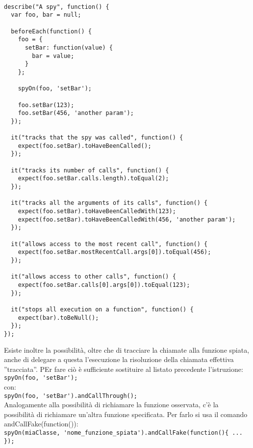 \documentclass[10pt,a4paper,onecolumn]{article}
\begin{document}
\begin{lstlisting}

describe("A spy", function() {
  var foo, bar = null;

  beforeEach(function() {
    foo = {
      setBar: function(value) {
        bar = value;
      }
    };

    spyOn(foo, 'setBar');

    foo.setBar(123);
    foo.setBar(456, 'another param');
  });

  it("tracks that the spy was called", function() {
    expect(foo.setBar).toHaveBeenCalled();
  });

  it("tracks its number of calls", function() {
    expect(foo.setBar.calls.length).toEqual(2);
  });

  it("tracks all the arguments of its calls", function() {
    expect(foo.setBar).toHaveBeenCalledWith(123);
    expect(foo.setBar).toHaveBeenCalledWith(456, 'another param');
  });

  it("allows access to the most recent call", function() {
    expect(foo.setBar.mostRecentCall.args[0]).toEqual(456);
  });

  it("allows access to other calls", function() {
    expect(foo.setBar.calls[0].args[0]).toEqual(123);
  });

  it("stops all execution on a function", function() {
    expect(bar).toBeNull();
  });
});
\end{lstlisting}

Esiste inoltre la possibilità, oltre che di tracciare la chiamate alla funzione spiata, anche di delegare a questa l'esecuzione la risoluzione della chiamata effettiva ''tracciata''. PEr fare ciò è sufficiente sostituire al listato precedente l'istruzione:\\

\verb|spyOn(foo, 'setBar');|\\

con:\\

\verb|spyOn(foo, 'setBar').andCallThrough();|\\

Analogamente alla possibilità di richiamare la funzione osservata, c'è la possibilità di richiamare un'altra funzione specificata. Per farlo si usa il comando andCallFake(function(){}):\\

\verb|spyOn(miaClasse, 'nome_funzione_spiata').andCallFake(function(){ ... });|\\
\end{document}
